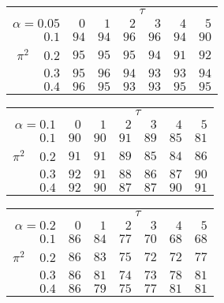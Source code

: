 \begin{tabular}{r|rrrrrr}
\hline\hline
 &\multicolumn{6}{c}{$\tau$} \\ 
 $\alpha = 0.05$ & $0$ & $1$ & $2$ & $3$ & $4$ & $5$ \\ 
 \hline$0.1$ & $94$ & $94$ & $96$ & $96$ & $94$ & $90$\\ 
$\pi^2\;\;\;$ $0.2$ & $95$ & $95$ & $95$ & $94$ & $91$ & $92$\\ 
$0.3$ & $95$ & $96$ & $94$ & $93$ & $93$ & $94$\\ 
$0.4$ & $96$ & $95$ & $93$ & $93$ & $95$ & $95$\\ 
 \hline 
 \end{tabular}
 
 \vspace{2em} 
 
\begin{tabular}{r|rrrrrr}
\hline\hline
 &\multicolumn{6}{c}{$\tau$} \\ 
 $\alpha = 0.1$ & $0$ & $1$ & $2$ & $3$ & $4$ & $5$ \\ 
 \hline$0.1$ & $90$ & $90$ & $91$ & $89$ & $85$ & $81$\\ 
$\pi^2\;\;\;$ $0.2$ & $91$ & $91$ & $89$ & $85$ & $84$ & $86$\\ 
$0.3$ & $92$ & $91$ & $88$ & $86$ & $87$ & $90$\\ 
$0.4$ & $92$ & $90$ & $87$ & $87$ & $90$ & $91$\\ 
 \hline 
 \end{tabular}
 
 \vspace{2em} 
 
\begin{tabular}{r|rrrrrr}
\hline\hline
 &\multicolumn{6}{c}{$\tau$} \\ 
 $\alpha = 0.2$ & $0$ & $1$ & $2$ & $3$ & $4$ & $5$ \\ 
 \hline$0.1$ & $86$ & $84$ & $77$ & $70$ & $68$ & $68$\\ 
$\pi^2\;\;\;$ $0.2$ & $86$ & $83$ & $75$ & $72$ & $72$ & $77$\\ 
$0.3$ & $86$ & $81$ & $74$ & $73$ & $78$ & $81$\\ 
$0.4$ & $86$ & $79$ & $75$ & $77$ & $81$ & $81$\\ 
 \hline 
 \end{tabular}
